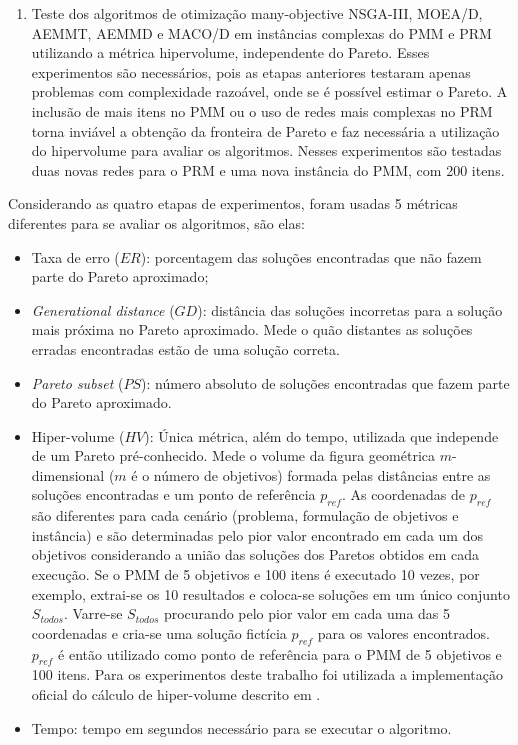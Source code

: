 \begin{enumerate}
	\item Teste dos algoritmos de otimização many-objective NSGA-III, MOEA/D, AEMMT, AEMMD e MACO/D em instâncias complexas do PMM e PRM utilizando a métrica hipervolume, independente do Pareto. Esses experimentos são necessários, pois as etapas anteriores testaram apenas problemas com complexidade razoável, onde se é possível estimar o Pareto. A inclusão de mais itens no PMM ou o uso de redes mais complexas no PRM torna inviável a obtenção da fronteira de Pareto e faz necessária a utilização do hipervolume para avaliar os algoritmos. Nesses experimentos são testadas duas novas redes para o PRM e uma nova instância do PMM, com 200 itens.
\end{enumerate}

Considerando as quatro etapas de experimentos, foram usadas 5 métricas diferentes para se avaliar os algoritmos, são elas:

\begin{itemize}
	\item Taxa de erro ($ER$): porcentagem das soluções encontradas que não fazem parte do Pareto aproximado;
	\item \textit{Generational distance} ($GD$): distância das soluções incorretas para a solução mais próxima no Pareto aproximado. Mede o quão distantes as soluções erradas encontradas estão de uma solução correta.
	\item \textit{Pareto subset} ($PS$): número absoluto de soluções encontradas que fazem parte do Pareto aproximado.
	\item Hiper-volume ($HV$): Única métrica, além do tempo, utilizada que independe de um Pareto pré-conhecido. Mede o volume da figura geométrica $m$-dimensional ($m$ é o número de objetivos) formada pelas distâncias entre as soluções encontradas e um ponto de referência $p_{ref}$. As coordenadas de $p_{ref}$ são diferentes para cada cenário (problema, formulação de objetivos e instância) e são determinadas pelo pior valor encontrado em cada um dos objetivos considerando a união das soluções dos Paretos obtidos em cada execução. Se o PMM de 5 objetivos e 100 itens é executado 10 vezes, por exemplo, extrai-se os 10 resultados e coloca-se soluções em um único conjunto $S_{todos}$. Varre-se $S_{todos}$ procurando pelo pior valor em cada uma das 5 coordenadas e cria-se uma solução fictícia $p_{ref}$ para os valores encontrados. $p_{ref}$ é então utilizado como ponto de referência para o PMM de 5 objetivos e 100 itens. Para os experimentos deste trabalho foi utilizada a implementação oficial do cálculo de hiper-volume descrito em \cite{Bradstreet2012}.
	\item Tempo: tempo em segundos necessário para se executar o algoritmo.
\end{itemize}


